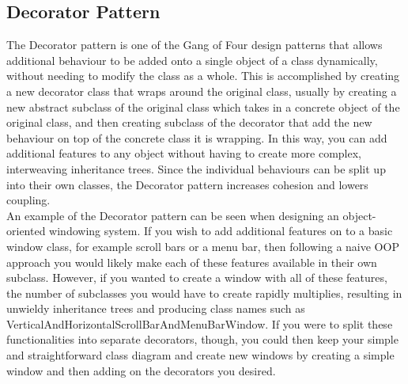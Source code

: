 \documentclass{article}
\begin{document}
    \subsection{Decorator Pattern}
    The Decorator pattern is one of the Gang of Four design patterns that allows
    additional behaviour to be added onto a single object of a class
    dynamically, without needing to modify the class as a whole. This is
    accomplished by creating a new decorator class that wraps around the
    original class, usually by creating a new abstract subclass of the original
    class which takes in a concrete object of the original class, and then
    creating subclass of the decorator that add the new behaviour on top of the
    concrete class it is wrapping. In this way, you can add additional features
    to any object without having to create more complex, interweaving
    inheritance trees. Since the individual behaviours can be split up into
    their own classes, the Decorator pattern increases cohesion and lowers
    coupling.\\
    An example of the Decorator pattern can be seen when designing an
    object-oriented windowing system. If you wish to add additional features on
    to a basic window class, for example scroll bars or a menu bar, then
    following a naive OOP approach you would likely make each of these features
    available in their own subclass. However, if you wanted to create a window
    with all of these features, the number of subclasses you would have to
    create rapidly multiplies, resulting in unwieldy inheritance trees and
    producing class names such as
    VerticalAndHorizontalScrollBarAndMenuBarWindow. If you were to split these
    functionalities into separate decorators, though, you could then keep your
    simple and straightforward class diagram and create new windows by creating
    a simple window and then adding on the decorators you desired.
    \newpage
\end{document}
